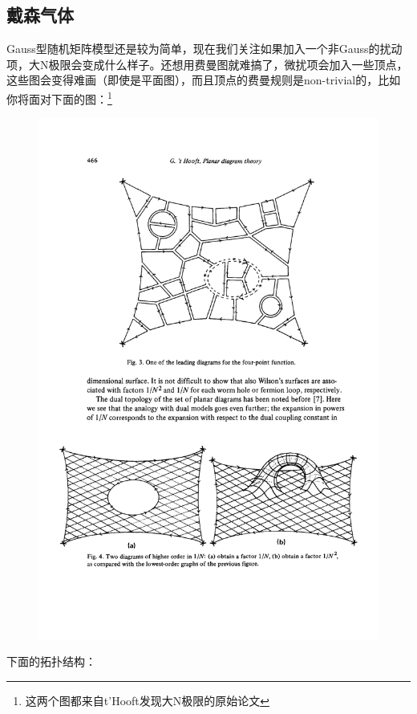 \subsection{戴森气体}
Gauss型随机矩阵模型还是较为简单，现在我们关注如果加入一个非Gauss的扰动项，大N极限会变成什么样子。还想用费曼图就难搞了，微扰项会加入一些顶点，这些图会变得难画（即使是平面图），而且顶点的费曼规则是non-trivial的，比如你将面对下面的图：\footnote{这两个图都来自t'Hooft发现大N极限的原始论文\cite{tHooft:1973alw}}
\begin{figure}[H]
	\centering
	\includegraphics{figs/fig12.pdf}
\end{figure}
下面的拓扑结构：
